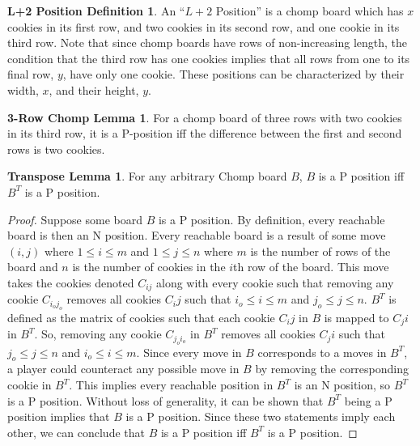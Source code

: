 \documentclass[a4paper,11pt,oneside]{article}
\author{Bryan Kaperick}
\begin{document}
\theoremstyle{definition}
\newtheorem{definition}{L+2 Position Definition}
\newtheorem{lemma}{3-Row Chomp Lemma}

\begin{definition}
An ``$L+2$ Position'' is a chomp board which has $x$ cookies in its first row, and two cookies in its second row, and one cookie in its third row.  Note that since chomp boards have rows of non-increasing length, the condition that the third row has one cookies implies that all rows from one to its final row, $y$, have only one cookie.  These positions can be characterized by their width, $x$, and their height, $y$.
\end{definition}

\begin{lemma}
	\label{lem:3r}
	For a chomp board of three rows with two cookies in its third row, it is a P-position iff the difference between the first and second rows is two cookies.
\end{lemma}

\newtheorem{transposelemma}{Transpose Lemma}

\begin{transposelemma}
	\label{lem:tr}
	For any arbitrary Chomp board $B$, $B$ is a P position iff $B^T$ is a P position.
\end{transposelemma}


\begin{proof}
	Suppose some board $B$ is a P position.  By definition, every reachable board is then an N position.  Every reachable board is a result of some move $(i,j)$ where $1\leq i \leq m$ and $1\leq j \leq n$ where $m$ is the number of rows of the board and $n$ is the number of cookies in the $i$th row of the board.  This move takes the cookies denoted $C_{ij}$ along with every cookie such that removing any cookie $C_{i_oj_o}$ removes all cookies $C_ij$ such that $i_o \leq i\leq m$ and $j_o\leq j \leq n$.  $B^T$ is defined as the matrix of cookies such that each cookie $C_ij$ in $B$ is mapped to $C_ji$ in $B^T$.  So, removing any cookie $C_{j_oi_o}$ in $B^T$ removes all cookies   $C_ji$ such that $j_o\leq j \leq n$ and $i_o \leq i\leq m$.  Since every move in $B$ corresponds to a moves in $B^T$, a player could counteract any possible move in $B$ by removing the corresponding cookie in $B^T$.  This implies every reachable position in $B^T$ is an N position, so $B^T$ is a P position.  Without loss of generality, it can be shown that $B^T$ being a P position implies that $B$ is a P position.  Since these two statements imply each other, we can conclude that $B$ is a P position iff $B^T$ is a P position.
\end{proof}
\end{document}
